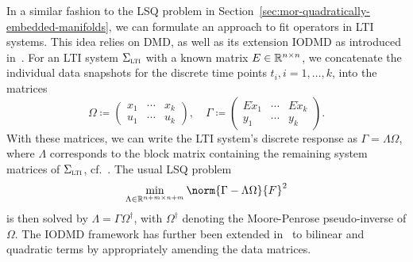 In a similar fashion to the \ac{LSQ} problem in Section~\ref{sec:mor-quadratically-embedded-manifolds}, we can formulate an approach to fit operators in \ac{LTI} systems.
This idea relies on \ac{DMD}, as well as its extension \ac{IODMD} as introduced in~\cite{Annoni2016}.
For an \ac{LTI} system $\Sigma_{\textnormal{\scshape lti}}$ with a known matrix $E \in \mathbb{R}^{n \times n}$, we concatenate the individual data snapshots for the discrete time points $t_i, i = 1, \dots, k$, into the matrices
\begin{equation}\label{eq:iodmd-data-matrices}
    \Omega \coloneqq \begin{pmatrix}
        x_1 & \cdots & x_k \\
        u_1 & \cdots & u_k
    \end{pmatrix},\quad \Gamma \coloneqq \begin{pmatrix}
        E \dot{x}_1 & \cdots & E \dot{x}_k \\
        y_1 & \cdots & y_k
    \end{pmatrix}.
\end{equation}
With these matrices, we can write the \ac{LTI} system's discrete response as $\Gamma = \Lambda \Omega$, where $\Lambda$ corresponds to the block matrix containing the remaining system matrices of $\Sigma_{\textnormal{\scshape lti}}$, cf.~\cite{Heiland2022}.
The usual \ac{LSQ} problem
\begin{equation*}
    \min\limits_{\Lambda \in \bb{R}^{n + m \times n + m}} \norm{\Gamma - \Lambda \Omega}{F}^2
\end{equation*}
is then solved by $\Lambda = \Gamma \Omega^\dagger$, with $\Omega^\dagger$ denoting the Moore-Penrose pseudo-inverse of $\Omega$.
The \ac{IODMD} framework has further been extended in~\cite{Gosea2021} to bilinear and quadratic terms by appropriately amending the data matrices.


